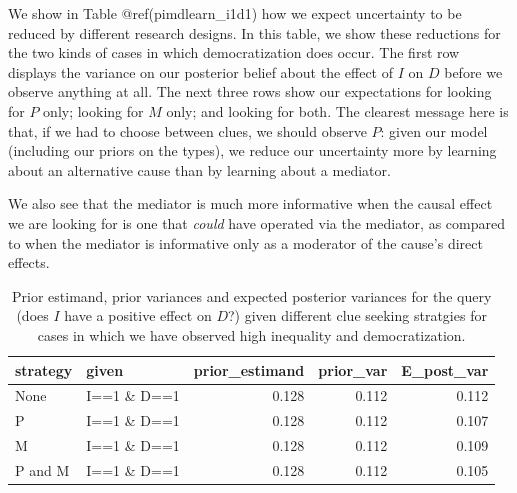 \documentclass[
  12pt,
]{book}
\begin{document}
We show in Table @ref(pimdlearn\_i1d1) how we expect uncertainty to be reduced by different research designs. In this table, we show these reductions for the two kinds of cases in which democratization does occur. The first row displays the variance on our posterior belief about the effect of \(I\) on \(D\) before we observe anything at all. The next three rows show our expectations for looking for \(P\) only; looking for \(M\) only; and looking for both. The clearest message here is that, if we had to choose between clues, we should observe \(P\): given our model (including our priors on the types), we reduce our uncertainty more by learning about an alternative cause than by learning about a mediator.

We also see that the mediator is much more informative when the causal effect we are looking for is one that \emph{could} have operated via the mediator, as compared to when the mediator is informative only as a moderator of the cause's direct effects.

\begin{table}

\caption{\label{tab:explearning}\label{pimdlearn_i1d1} Prior estimand, prior variances and expected posterior variances for the query (does $I$ have a positive effect on $D$?) given different clue seeking  stratgies for cases in which we have observed high inequality and democratization.}
\centering
\begin{tabular}[t]{l|l|r|r|r}
\hline
strategy & given & prior\_estimand & prior\_var & E\_post\_var\\
\hline
None & I==1 \& D==1 & 0.128 & 0.112 & 0.112\\
\hline
P & I==1 \& D==1 & 0.128 & 0.112 & 0.107\\
\hline
M & I==1 \& D==1 & 0.128 & 0.112 & 0.109\\
\hline
P and M & I==1 \& D==1 & 0.128 & 0.112 & 0.105\\
\hline
\end{tabular}
\end{table}
\end{document}
